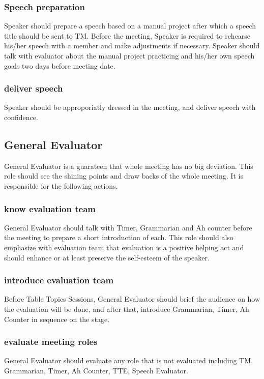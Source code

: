 \subsubsection{Speech preparation}
Speaker should prepare a speech based on a manual project after which a speech title 
should be sent to TM. Before the meeting, Speaker is required to rehearse his/her 
speech with a member and make adjustments if necessary. Speaker should talk with 
evaluator about the manual project practicing and his/her own speech goals two days 
before meeting date. 

\subsubsection{deliver speech}
Speaker should be approporiatly dressed in the meeting, and deliver speech with confidence.

\subsection{General Evaluator}
General Evaluator is a guarateen that whole meeting has no big deviation. This role
should see the shining points and draw backs of the whole meeting. It is responsible
for the following actions.

\subsubsection{know evaluation team}
General Evaluator should talk with Timer, Grammarian and Ah counter before the meeting
to prepare a short introduction of each. This role should also emphasize with evaluation 
team that evaluation is a positive helping act and should enhance or at least preserve 
the self-esteem of the speaker.

\subsubsection{introduce evaluation team}
Before Table Topics Sessions, General Evaluator should brief the audience on how the 
evaluation will be done, and after that, introduce Grammarian, Timer, Ah Counter in 
sequence on the stage.

\subsubsection{evaluate meeting roles}
General Evaluator should evaluate any role that is not evaluated including TM, Grammarian,
Timer, Ah Counter, TTE, Speech Evaluator.

